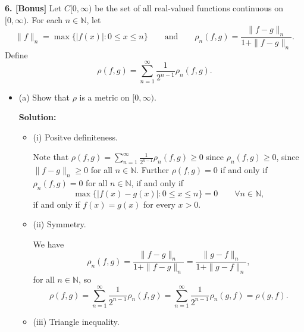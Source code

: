 \documentclass[12pt]{article}
\begin{document}
{\bf 6. [Bonus]} Let $C[0,\infty)$ be the set of all real-valued functions continuous on
$[0,\infty)$. For each $n \in \mathbb{N}$, let 
\[ \|f\|_{n} = \max\{|f(x)| : 0 \leq x \leq n\} \qquad \text{and}\qquad
\rho_{n}(f,g) = \frac{\|f-g\|_{n}}{1+\|f-g\|_{n}}. \]
Define 
\[ \rho(f,g) = \sum_{n=1}^{\infty}\frac{1}{2^{n-1}}\rho_{n}(f,g). \]

\begin{itemize}[label={},leftmargin=4mm, itemsep=1em, parsep=1em]
  \item (a) Show that $\rho$ is a metric on $[0,\infty)$.

  {\bf Solution:}

  \begin{itemize}[label={},leftmargin=4mm, itemsep=1em, parsep=1em]
    \item (i) Positve definiteness.

    Note that $\rho(f,g) = \sum_{n=1}^{\infty}\frac{1}{2^{n-1}}\rho_{n}(f,g)
    \geq 0$ since $\rho_{n}(f,g) \geq 0$, since $\|f-g\|_{n} \geq 0$ for all
    $n\in\mathbb{N}$. Further $\rho(f,g) = 0$ if and only if $\rho_{n}(f,g) = 0$
    for all $n\in\mathbb{N}$, if and only if 
    \[ \max\{|f(x) - g(x)|:0\leq x \leq n\} = 0 \qquad \forall n \in\mathbb{N},
    \]
    if and only if $f(x) = g(x)$ for every $x > 0$.

    \item (ii) Symmetry.

    We have 
    \[ \rho_{n}(f,g) = \frac{\|f-g\|_{n}}{1+\|f-g\|_{n}} =
    \frac{\|g-f\|_{n}}{1+\|g-f\|_{n}}, \]
    for all $n\in \mathbb{N}$, so 
    \[ \rho(f,g) = \sum_{n=1}^{\infty}\frac{1}{2^{n-1}}\rho_{n}(f,g) =
    \sum_{n=1}^{\infty}\frac{1}{2^{n-1}}\rho_{n}(g,f) = \rho(g,f). \]

    \item (iii) Triangle inequality.


\end{itemize}
\end{itemize}
\end{document}
